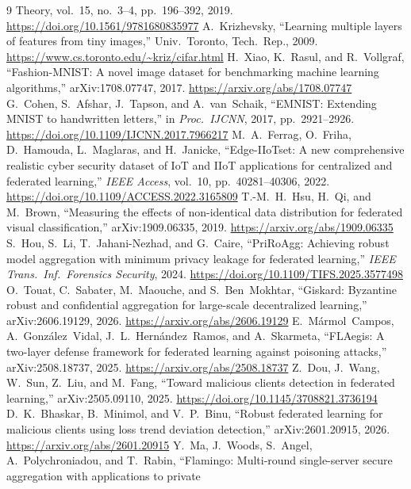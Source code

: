 \documentclass[lettersize,journal]{IEEEtran}
\begin{document}
\begin{thebibliography}{9}
{Theory}, vol.\ 15, no.\ 3--4, pp.\ 196--392, 2019. \url{https://doi.org/10.1561/9781680835977}
 A.\ Krizhevsky, ``Learning multiple layers of features
from tiny images,'' Univ.\ Toronto, Tech.\ Rep., 2009. \url{https://www.cs.toronto.edu/~kriz/cifar.html}
 H.\ Xiao, K.\ Rasul, and R.\ Vollgraf, ``Fashion-MNIST: A
novel image dataset for benchmarking machine learning algorithms,''
arXiv:1708.07747, 2017. \url{https://arxiv.org/abs/1708.07747}
 G.\ Cohen, S.\ Afshar, J.\ Tapson, and A.\ van~Schaik, ``EMNIST:
Extending MNIST to handwritten letters,'' in \emph{Proc.\ IJCNN}, 2017,
pp.\ 2921--2926. \url{https://doi.org/10.1109/IJCNN.2017.7966217}
 M.\ A.\ Ferrag, O.\ Friha, D.\ Hamouda, L.\ Maglaras, and
H.\ Janicke, ``Edge-IIoTset: A new comprehensive realistic cyber security dataset
of IoT and IIoT applications for centralized and federated learning,'' \emph{IEEE
Access}, vol.\ 10, pp.\ 40281--40306, 2022. \url{https://doi.org/10.1109/ACCESS.2022.3165809}
 T.-M.\ H.\ Hsu, H.\ Qi, and M.\ Brown, ``Measuring the effects
of non-identical data distribution for federated visual classification,''
arXiv:1909.06335, 2019. \url{https://arxiv.org/abs/1909.06335}
 S.\ Hou, S.\ Li, T.\ Jahani-Nezhad, and G.\ Caire, ``PriRoAgg:
Achieving robust model aggregation with minimum privacy leakage for federated
learning,'' \emph{IEEE Trans.\ Inf.\ Forensics Security}, 2024. \url{https://doi.org/10.1109/TIFS.2025.3577498}
 O.\ Touat, C.\ Sabater, M.\ Maouche, and S.\ Ben~Mokhtar,
``Giskard: Byzantine robust and confidential aggregation for large-scale decentralized
learning,'' arXiv:2606.19129, 2026. \url{https://arxiv.org/abs/2606.19129}
 E.\ M\'armol~Campos, A.\ Gonz\'alez~Vidal, J.\ L.\
Hern\'andez~Ramos, and A.\ Skarmeta, ``FLAegis: A two-layer defense framework for
federated learning against poisoning attacks,'' arXiv:2508.18737, 2025. \url{https://arxiv.org/abs/2508.18737}
\bibitem{safefl2025} Z.\ Dou, J.\ Wang, W.\ Sun, Z.\ Liu, and M.\ Fang, ``Toward
malicious clients detection in federated learning,'' arXiv:2505.09110, 2025. \url{https://doi.org/10.1145/3708821.3736194}
\bibitem{flltd2026} D.\ K.\ Bhaskar, B.\ Minimol, and V.\ P.\ Binu, ``Robust federated
learning for malicious clients using loss trend deviation detection,''
arXiv:2601.20915, 2026. \url{https://arxiv.org/abs/2601.20915}
 Y.\ Ma, J.\ Woods, S.\ Angel, A.\ Polychroniadou, and T.\ Rabin,
``Flamingo: Multi-round single-server secure aggregation with applications to private

\end{thebibliography}
\end{document}
